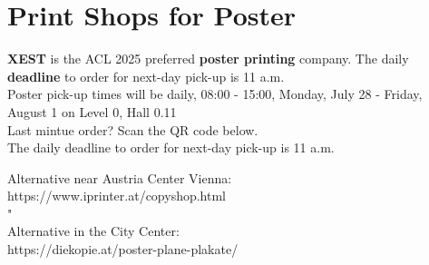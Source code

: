 \clearpage

\section{Print Shops for Poster}

\textbf{XEST} is the ACL 2025 preferred \textbf{poster printing} company. The daily \textbf{deadline} to order for next-day pick-up is 11 a.m.\\
 
Poster pick-up times will be daily, 08:00 - 15:00, Monday, July 28 - Friday, August 1 on Level 0, Hall 0.11\\



Last mintue order? Scan the QR code below.\\
The daily deadline to order for next-day pick-up is 11 a.m.



Alternative near Austria Center Vienna:\\
https://www.iprinter.at/copyshop.html	\\																								"
\\
Alternative in the City Center:\\
https://diekopie.at/poster-plane-plakate/\\
